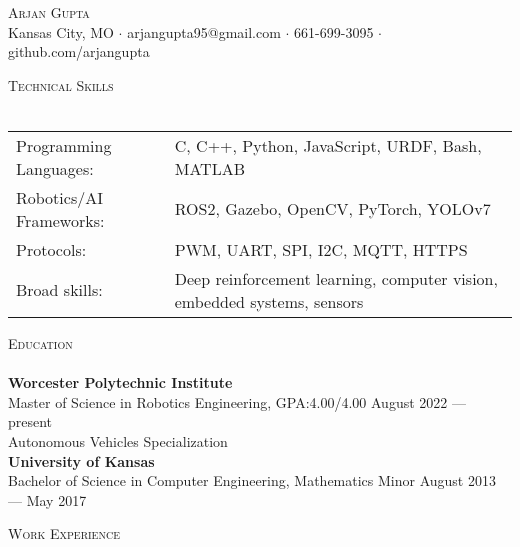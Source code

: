 \documentclass[a4paper]{article}
\newcommand{\lineunder} {
    \vspace*{-8pt} \\
    \hspace*{-18pt} \hrulefill \\
}
\newcommand{\header} [1] {
    {\hspace*{-18pt}\vspace*{6pt} \textsc{#1}}
    \vspace*{-6pt} \lineunder
}
\begin{document}
\vspace*{-40pt}

    

\vspace*{-10pt}
\begin{center}
	{\Huge \scshape {Arjan Gupta}}\\
	Kansas City, MO $\cdot$ arjangupta95@gmail.com $\cdot$ 661-699-3095 $\cdot$ github.com/arjangupta\\
\end{center}

\header{Technical Skills}
\vspace{2mm}
\begin{tabular}{ l l }
	Programming Languages: & C, C++, Python, JavaScript, URDF, Bash, MATLAB \\
    Robotics/AI Frameworks:   & ROS2, Gazebo, OpenCV, PyTorch, YOLOv7 \\
    Protocols:             & PWM, UART, SPI, I2C, MQTT,  HTTPS \\
    Broad skills: & Deep reinforcement learning, computer vision, embedded systems, sensors
\end{tabular}
\vspace{2mm}

\header{Education}
\textbf{Worcester Polytechnic Institute}\\
Master of Science in Robotics Engineering, GPA:\@ 4.00/4.00 \hfill August 2022 --- present\\
Autonomous Vehicles Specialization\\
\vspace{2mm}
\textbf{University of Kansas}\\
Bachelor of Science in Computer Engineering, Mathematics Minor \hfill August 2013 --- May 2017\\

\vspace{3mm}

\header{Work Experience}
\vspace{1mm}
\end{document}
